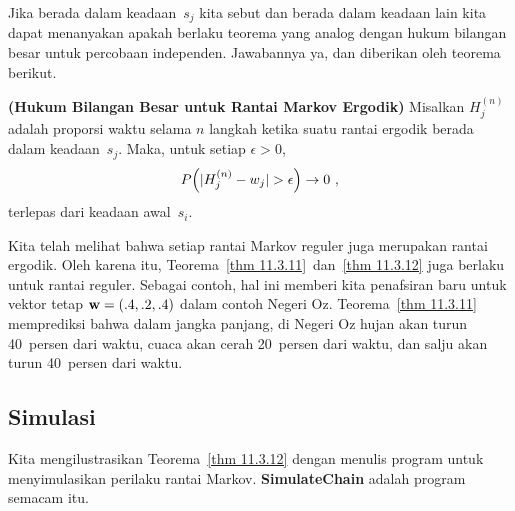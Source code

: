 Jika berada dalam keadaan~$s_j$ kita sebut  dan berada dalam
keadaan lain  kita dapat menanyakan apakah berlaku teorema yang
analog dengan hukum bilangan besar untuk percobaan independen. Jawabannya ya,
dan diberikan oleh teorema berikut.

\begin{theorem}{\bf (Hukum Bilangan Besar untuk Rantai Markov Ergodik)}\label{thm
11.3.12}
Misalkan $H_j^{(n)}$ adalah proporsi waktu selama $n$ langkah ketika suatu
rantai ergodik berada dalam keadaan~$s_j$. Maka, untuk setiap $\epsilon > 0$,
$$
P\Bigl(|H_j^{(n)} - w_j| > \epsilon\Bigr) \to 0\ ,
$$
terlepas dari keadaan awal~$s_i$.
\end{theorem}

Kita telah melihat bahwa setiap rantai Markov reguler juga merupakan rantai
ergodik. Oleh karena itu, Teorema~\ref{thm 11.3.11}~dan~\ref{thm 11.3.12} juga
berlaku untuk rantai reguler. Sebagai contoh, hal ini memberi kita penafsiran
baru untuk vektor tetap ${\mbox{\bf w}\/} = (.4,.2,.4)$ dalam contoh Negeri Oz.
Teorema~\ref{thm 11.3.11} memprediksi bahwa dalam jangka panjang, di Negeri Oz
hujan akan turun 40~persen dari waktu, cuaca akan cerah 20~persen dari waktu,
dan salju akan turun 40~persen dari waktu.

\subsection*{Simulasi}
Kita mengilustrasikan Teorema~\ref{thm 11.3.12} dengan menulis program untuk
menyimulasikan perilaku rantai Markov. {\bf SimulateChain}
adalah program semacam itu.  

